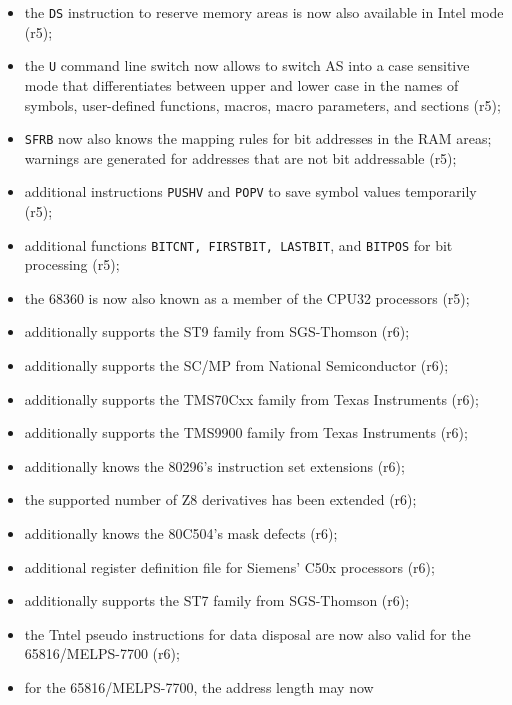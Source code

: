 \documentclass[12pt,twoside]{report}
\newcommand{\tty}[1]{{\tt #1}}
\begin{document}
\begin{itemize}
{\begin{itemize}
{            appropriately (r5);}
      \item{the \tty{DS} instruction to reserve memory areas is now
            also available in Intel mode (r5);}
      \item{the \tty{U} command line switch now allows to switch AS
            into a case sensitive mode that differentiates
            between upper and lower case in the names of symbols,
            user-defined functions, macros, macro parameters, and 
            sections (r5);}
      \item{\tty{SFRB} now also knows the mapping rules for bit
            addresses in the RAM areas; warnings are generated
            for addresses that are not bit addressable (r5);}
      \item{additional instructions \tty{PUSHV} and \tty{POPV} to save symbol
            values temporarily (r5);}
      \item{additional functions \tty{BITCNT, FIRSTBIT, LASTBIT}, and
            \tty{BITPOS} for bit processing (r5);}
      \item{the 68360 is now also known as a member of the CPU32
            processors (r5);}
      \item{additionally supports the ST9 family from SGS-Thomson
            (r6);}
      \item{additionally supports the SC/MP from National
            Semiconductor (r6);}
      \item{additionally supports the TMS70Cxx family from Texas
            Instruments (r6);}
      \item{additionally supports the TMS9900 family from Texas
            Instruments (r6);}
      \item{additionally knows the 80296's instruction set
            extensions (r6);}
      \item{the supported number of Z8 derivatives has been
            extended (r6);}
      \item{additionally knows the 80C504's mask defects (r6);}
      \item{additional register definition file for Siemens' C50x
            processors (r6);}
      \item{additionally supports the ST7 family from SGS-Thomson
            (r6);}
      \item{the Tntel pseudo instructions for data disposal are
            now also valid for the 65816/MELPS-7700 (r6);}
      \item{for the 65816/MELPS-7700, the address length may now
}
\end{itemize}}
\end{itemize}
\end{document}
